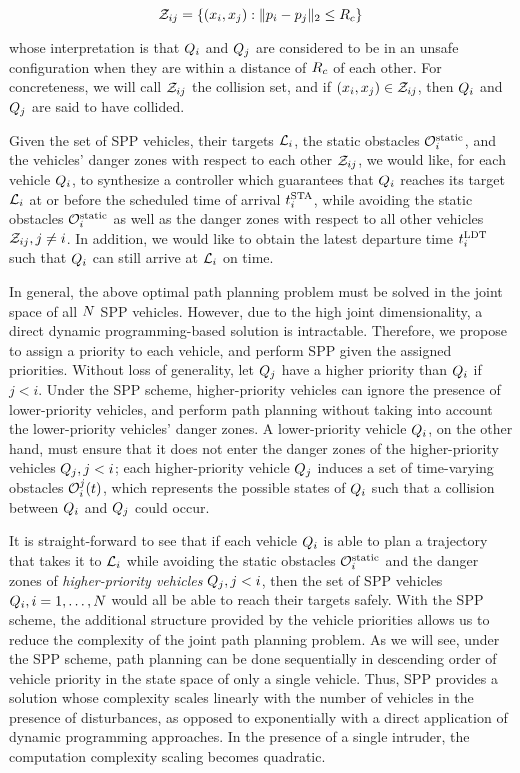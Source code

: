 \begin{equation}
\mathcal{Z}_{ij} = \{(x_i, x_j): \|p_i - p_j\|_2 \le R_c\}
\end{equation}

\noindent whose interpretation is that $Q_i$ and $Q_j$ are considered to be in an unsafe configuration when they are within a distance of $R_c$ of each other. For concreteness, we will call $\mathcal{Z}_{ij}$ the collision set, and if $(x_i, x_j) \in \mathcal{Z}_{ij}$, then $Q_i$ and $Q_j$ are said to have collided.

Given the set of SPP vehicles, their targets $\mathcal{L}_i$, the static obstacles $\mathcal{O}^\text{static}_i$, and the vehicles' danger zones with respect to each other $\mathcal{Z}_{ij}$, we would like, for each vehicle $Q_i$, to synthesize a controller which guarantees that $Q_i$ reaches its target $\mathcal{L}_i$ at or before the scheduled time of arrival $t^\text{STA}_i$, while avoiding the static obstacles $\mathcal{O}^\text{static}_i$ as well as the danger zones with respect to all other vehicles $\mathcal{Z}_{ij}, j\neq i$. In addition, we would like to obtain the latest departure time $t^\text{LDT}_i$ such that $Q_i$ can still arrive at $\mathcal{L}_i$ on time.

In general, the above optimal path planning problem must be solved in the joint space of all $N$ SPP vehicles. However, due to the high joint dimensionality, a direct dynamic programming-based solution is intractable. Therefore, we propose to assign a priority to each vehicle, and perform SPP given the assigned priorities. Without loss of generality, let $Q_j$ have a higher priority than $Q_i$ if $j<i$. Under the SPP scheme, higher-priority vehicles can ignore the presence of lower-priority vehicles, and perform path planning without taking into account the lower-priority vehicles' danger zones. A lower-priority vehicle $Q_i$, on the other hand, must ensure that it does not enter the danger zones of the higher-priority vehicles $Q_j, j<i$; each higher-priority vehicle $Q_j$ induces a set of time-varying obstacles $\mathcal{O}_i^j(t)$, which represents the possible states of $Q_i$ such that a collision between $Q_i$ and $Q_j$ could occur.

It is straight-forward to see that if each vehicle $Q_i$ is able to plan a trajectory that takes it to $\mathcal{L}_i$ while avoiding the static obstacles $\mathcal{O}^\text{static}_i$ and the danger zones of \textit{higher-priority vehicles} $Q_j, j<i$, then the set of SPP vehicles $Q_i, i=1,\ldots,N$ would all be able to reach their targets safely. With the SPP scheme, the additional structure provided by the vehicle priorities allows us to reduce the complexity of the joint path planning problem. As we will see, under the SPP scheme, path planning can be done sequentially in descending order of vehicle priority in the state space of only a single vehicle. Thus, SPP provides a solution whose complexity scales linearly with the number of vehicles in the presence of disturbances, as opposed to exponentially with a direct application of dynamic programming approaches. In the presence of a single intruder, the computation complexity scaling becomes quadratic.